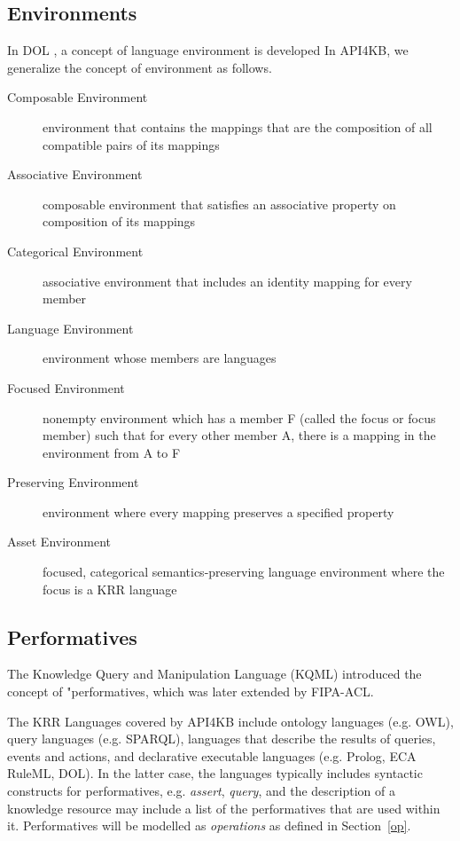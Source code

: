 \documentclass[runningheads]{llncs}
\begin{document}
\subsection{Environments}
In DOL  , a concept of language environment is developed 
In API4KB, we generalize the concept of environment as follows.
\label{krassetenv}
\begin{description}
\item[Composable Environment] environment that contains the mappings that are the composition of all compatible pairs of its mappings
\item[Associative Environment] composable environment that satisfies an associative property on composition of its mappings
\item[Categorical Environment] associative environment that includes an identity mapping for every member
\item[Language Environment] environment whose members are languages
\item[Focused Environment] nonempty environment which has a member F (called the focus or focus member) such that for every other member A, there is a mapping in the environment from A to F
\item[Preserving Environment] environment where every mapping preserves a specified property
\item[Asset Environment] focused, categorical semantics-preserving language environment where the focus is a KRR language
\end{description}

\subsection{Performatives}
The Knowledge Query and Manipulation Language (KQML)  introduced the concept of "performatives, which was later extended by FIPA-ACL.

The KRR Languages covered by API4KB include ontology languages (e.g. OWL), query languages (e.g. SPARQL), languages that describe the results of queries, events and actions, and declarative executable languages (e.g. Prolog, ECA RuleML, DOL). In the latter case, the languages typically includes syntactic constructs for performatives, e.g. \emph{assert}, \emph{query}, and the description of a knowledge resource may include a list of the performatives that are used within it.  Performatives will be modelled as \emph{operations} as defined in Section~\ref{op}.
\end{document}

